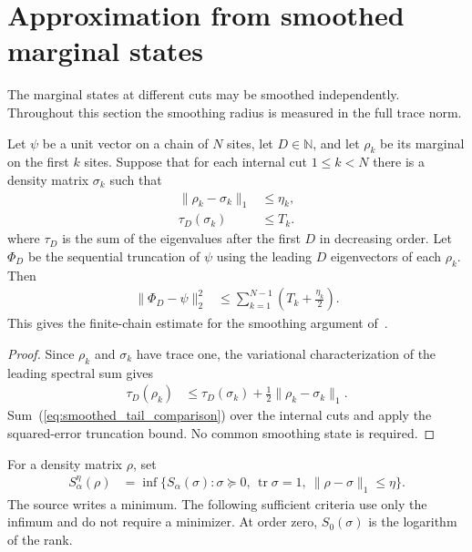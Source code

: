 \section{Approximation from smoothed marginal states}

The marginal states at different cuts may be smoothed independently.
Throughout this section the smoothing radius is measured in the full trace norm.

\begin{lemma}
    \label{thm:smoothed_marginal_truncation}
    \leanok
    Let $\psi$ be a unit vector on a chain of $N$ sites, let $D\in\mathbb N$, and
    let $\rho_k$ be its marginal on the first $k$ sites. Suppose that for each
    internal cut $1\le k<N$ there is a density matrix $\sigma_k$ such that
    \begin{align}
        \|\rho_k-\sigma_k\|_1 & \le\eta_k,\label{eq:smoothed_marginal_distance} \\
        \tau_D(\sigma_k)      & \le T_k.\label{eq:smoothed_marginal_tail}
    \end{align}
    where $\tau_D$ is the sum of the eigenvalues after the first $D$ in
    decreasing order. Let $\Phi_D$ be the sequential truncation of $\psi$
    using the leading $D$ eigenvectors of each $\rho_k$. Then
    \begin{align}
        \|\Phi_D-\psi\|_2^2 & \le
        \sum_{k=1}^{N-1}\left(T_k+\frac{\eta_k}{2}\right).
        \label{eq:smoothed_truncation_error}
    \end{align}
    This gives the finite-chain estimate for the smoothing argument
    of~\cite{Schuch2008EntropyScaling}.
\end{lemma}
\begin{proof}
    \leanok
    Since $\rho_k$ and $\sigma_k$ have trace one, the variational characterization
    of the leading spectral sum gives
    \begin{align}
        \tau_D(\rho_k) & \le\tau_D(\sigma_k)
        +\frac12\|\rho_k-\sigma_k\|_1.
        \label{eq:smoothed_tail_comparison}
    \end{align}
    Sum~(\ref{eq:smoothed_tail_comparison}) over the internal cuts and apply the squared-error
    truncation bound. No common smoothing state is required.
\end{proof}

For a density matrix $\rho$, set
\begin{align}
    S_\alpha^\eta(\rho) & =
    \inf\{S_\alpha(\sigma):\sigma\succeq0,\,
    \operatorname{tr}\sigma=1,\ \|\rho-\sigma\|_1\le\eta\}.
    \label{eq:smooth_renyi_definition}
\end{align}
The source writes a minimum. The following sufficient criteria use only the
infimum and do not require a minimizer. At order zero, $S_0(\sigma)$ is the
logarithm of the rank.

